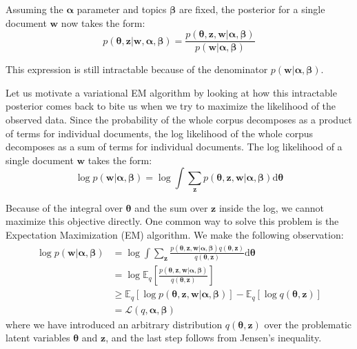 \documentclass{article}
\newcommand{\diff}{\mathrm{d}}
\begin{document}
Assuming the $\bm{\alpha}$ parameter and topics $\bm{\beta}$ are fixed, the posterior for a single document $\mathbf{w}$ now takes the form:
\begin{equation}
p(\bm{\theta}, \mathbf{z} | \mathbf{w}, \bm{\alpha}, \bm{\beta}) =
\frac{p(\bm{\theta}, \mathbf{z}, \mathbf{w} | \bm{\alpha}, \bm{\beta})}
		{p(\mathbf{w} | \bm{\alpha}, \bm{\beta})} 
\end{equation}

This expression is still intractable because of the denominator $p(\mathbf{w} | \bm{\alpha}, \bm{\beta})$. 

Let us motivate a variational EM algorithm by looking at how this intractable posterior comes back to bite us when we try to maximize the likelihood of the observed data. Since the probability of the whole corpus decomposes as a product of terms for individual documents, the log likelihood of the whole corpus decomposes as a sum of terms for individual documents. The log likelihood of a single document $\mathbf{w}$ takes the form:
\begin{equation}
\log p(\mathbf{w} | \bm{\alpha}, \bm{\beta}) =
	\log \int \sum_{\mathbf{z}} p (\bm{\theta}, \mathbf{z}, \mathbf{w} | \bm{\alpha}, \bm{\beta}) \diff\bm{\theta} 
\end{equation}

Because of the integral over $\bm{\theta}$ and the sum over $\mathbf{z}$ inside the log, we cannot maximize this objective directly. One common way to solve this problem is the Expectation Maximization (EM) algorithm. We make the following observation:
\begin{align*}
\log p(\mathbf{w} | \bm{\alpha}, \bm{\beta}) 
&= \log \int \sum_{\mathbf{z}} \frac{p (\bm{\theta}, \mathbf{z}, \mathbf{w} | \bm{\alpha}, \bm{\beta}) q(\bm{\theta}, \mathbf{z})}{q(\bm{\theta}, \mathbf{z})}  \diff\bm{\theta} \\
&= \log \mathbb{E}_q \left[ \frac{p (\bm{\theta}, \mathbf{z}, \mathbf{w} | \bm{\alpha}, \bm{\beta})}{q(\bm{\theta}, \mathbf{z})} \right] \\
&\geq \mathbb{E}_q \left[\log p(\bm{\theta}, \mathbf{z}, \mathbf{w} | \bm{\alpha}, \bm{\beta})\right] - \mathbb{E}_q \left[\log q(\bm{\theta}, \mathbf{z})\right] \\
&= \mathcal{L}(q, \bm{\alpha}, \bm{\beta})
\end{align*}
where we have introduced an arbitrary distribution $q(\bm{\theta}, \mathbf{z})$ over the problematic latent variables $\bm{\theta}$ and $\mathbf{z}$, and the last step follows from Jensen's inequality.
\end{document}
